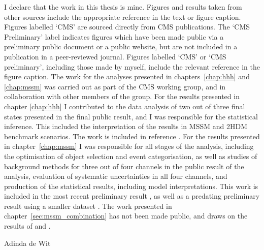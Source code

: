 \begin{declaration}
  \vspace*{1cm}
  I declare that the work in this thesis is mine. Figures and results taken from other sources
include the appropriate reference in the text or figure caption. Figures labelled `CMS' are sourced
directly from CMS publications. The `CMS Preliminary' label indicates figures which
have been made public via a preliminary public document or a public website, but are not
included in a publication in a peer-reviewed journal. Figures labelled `CMS' or `CMS preliminary', 
including those made by myself, include the relevant reference in the figure caption.
The work for the analyses presented in chapters~\ref{chap:hhh} and \ref{chap:mssm} was 
carried out as part of the CMS \Htotautau working group, and in collaboration with other members of the group.
For the results presented in chapter \ref{chap:hhh} I contributed to the data analysis of two out of three
final states presented in the final public result, and I 
was responsible for the statistical inference. This included
the interpretation of the results in MSSM and 2HDM benchmark scenarios. The 
work is included in reference \cite{CMS-HIG-14-034}. For the results presented in chapter~\ref{chap:mssm}
I was responsible for all stages of the analysis, including the optimisation
of object selection and event categorisation, as well as studies of background
methods for three out of four channels in the public result of the analysis,
evaluation of systematic uncertainties in all four channels, and production of the statistical
results, including model interpretations. This work is included in the most recent
preliminary result \cite{CMS-PAS-HIG-16-037}, as well as a predating preliminary
result using a smaller dataset \cite{CMS-PAS-HIG-16-006}.
The work presented in chapter~\ref{sec:mssm_combination} has
not been made public, and draws on the results of \cite{CMS-PAS-HIG-16-037} and \cite{CMS-PAS-HIG-16-006}.

  \begin{flushright}
  Adinda de Wit
  \end{flushright}
\end{declaration}




\tableofcontents
\listoffigures
\listoftables





